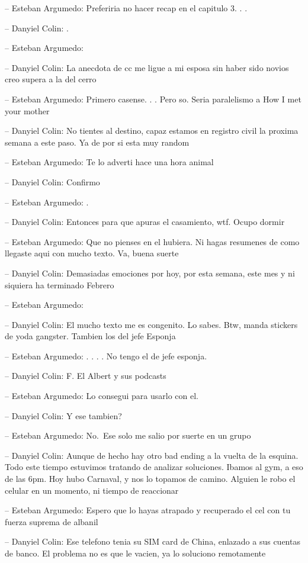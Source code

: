 -- Esteban Argumedo: Preferiria no hacer recap en el capitulo 3. . .

-- Danyiel Colin: .

-- Esteban Argumedo:

-- Danyiel Colin: La anecdota de cc me ligue a mi esposa sin haber sido
novios creo supera a la del cerro

-- Esteban Argumedo: Primero casense. . . Pero so. Seria paralelismo a
How I met your mother

-- Danyiel Colin: No tientes al destino, capaz estamos en registro civil
la proxima semana a este paso. Ya de por si esta muy random

-- Esteban Argumedo: Te lo adverti hace una hora animal

-- Danyiel Colin: Confirmo

-- Esteban Argumedo: .

-- Danyiel Colin: Entonces para que apuras el casamiento, wtf. Ocupo
dormir

-- Esteban Argumedo: Que no pienses en el hubiera. Ni hagas resumenes de
como llegaste aqui con mucho texto. Va, buena suerte

-- Danyiel Colin: Demasiadas emociones por hoy, por esta semana, este
mes y ni siquiera ha terminado Febrero

-- Esteban Argumedo:

-- Danyiel Colin: El mucho texto me es congenito. Lo sabes. Btw, manda
stickers de yoda gangster. Tambien los del jefe Esponja

-- Esteban Argumedo: . . . . No tengo el de jefe esponja.

-- Danyiel Colin: F. El Albert y sus podcasts

-- Esteban Argumedo: Lo consegui para usarlo con el.

-- Danyiel Colin: Y ese tambien?

-- Esteban Argumedo: No.~Ese solo me salio por suerte en un grupo

-- Danyiel Colin: Aunque de hecho hay otro bad ending a la vuelta de la
esquina. Todo este tiempo estuvimos tratando de analizar soluciones.
Ibamos al gym, a eso de las 6pm. Hoy hubo Carnaval, y nos lo topamos de
camino. Alguien le robo el celular en un momento, ni tiempo de
reaccionar

-- Esteban Argumedo: Espero que lo hayas atrapado y recuperado el cel
con tu fuerza suprema de albanil

-- Danyiel Colin: Ese telefono tenia su SIM card de China, enlazado a
sus cuentas de banco. El problema no es que le vacien, ya lo soluciono
remotamente


